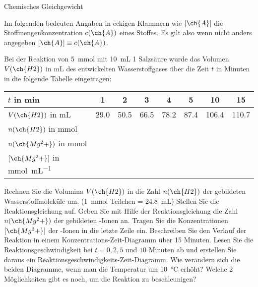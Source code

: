 \documentclass[DIV11]{scrartcl}
\begin{document}
\begin{center}
  \Huge\sffamily Chemisches Gleichgewicht
\end{center}

\noindent
Im folgenden bedeuten Angaben in eckigen Klammern wie $[\ch{A}]$ die
Stoffmengenkonzentration $c(\ch{A})$ eines Stoffes.  Es gilt also wenn nicht
anders angegeben $[\ch{A}] \equiv c(\ch{A})$.



\begin{question}[name=Reaktionsgeschwindigkeit]
Bei der Reaktion von \SI{5}{\milli\mole}  mit \SI{10}{\milli\liter}
\SI{1}{\Molar} Salzsäure wurde das Volumen $V(\ch{H2})$ in \si{\milli\liter}
des entwickelten Wasserstoffgases über die Zeit $t$ in Minuten in die folgende
Tabelle eingetragen:
\begin{center}
 \begin{tabular}{ l*{5}{S[table-format=2.1]}*{2}{S[table-format=3.1]} }
  \toprule
   $t$ in \si{\minute}
     &  1   &  2   &  3   &  4   &  5   &  10   &  15 \\
  \midrule
   $V(\ch{H2})$ in \si{\milli\liter}
     & 29.0 & 50.5 & 66.5 & 78.2 & 87.4 & 106.4 & 110.7 \\
   $n(\ch{H2})$ in \si{\milli\mole} \\
   $n(\ch{Mg^2+})$ in \si{\milli\mole} \\
   $[\ch{Mg^2+}]$ in \si{\milli\mole\per\milli\liter} \\
  \bottomrule
 \end{tabular}
\end{center}
\begin{tasks}
 \task Rechnen Sie die Volumina $V(\ch{H2})$ in die Zahl $n(\ch{H2})$ der
   gebildeten Wasserstoffmoleküle um.  (\SI{1}{\milli\mole} Teilchen =
   \SI{24.8}{\milli\liter})
 \task Stellen Sie die Reaktionsgleichung auf.
 \task Geben Sie mit Hilfe der Reaktionsgleichung die Zahl $n(\ch{Mg^2+})$ der
   gebildeten -Ionen an.
 \task Tragen Sie die Konzentrationen $[\ch{Mg^2+}]$ der -Ionen in die
   letzte Zeile ein.
 \task Beschreiben Sie den Verlauf der Reaktion in einem
   Konzentrations-Zeit-Diagramm über \num{15} Minuten.
 \task Lesen Sie die Reaktionsgeschwindigkeit bei $t=0,2,5$ und $10$ Minuten
   ab und erstellen Sie daraus ein Reaktionsgeschwindigkeits-Zeit-Diagramm.
 \task Wie verändern sich die beiden Diagramme, wenn man die Temperatur um
   \SI{10}{\celsius} erhöht?
 \task Welche 2 Möglichkeiten gibt es noch, um die Reaktion zu beschleunigen?
\end{tasks}
\end{question}
\end{document}

